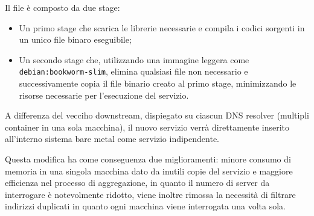 Il file è composto da due stage:
\begin{itemize}
    \item Un primo stage che scarica le librerie necessarie e compila i codici sorgenti in un unico file binaro eseguibile;
    \item Un secondo stage che, utilizzando una immagine leggera come \\ \texttt{debian:bookworm-slim}, elimina qualsiasi file non necessario e successivamente copia il file binario creato al primo stage, minimizzando le risorse necessarie per l'esecuzione del servizio.
\end{itemize}

A differenza del vecciho downstream, dispiegato su ciascun \ac{DNS} resolver (multipli container in una sola macchina), il nuovo servizio verrà direttamente inserito all'interno sistema bare metal come servizio indipendente.

Questa modifica ha come conseguenza due miglioramenti: minore consumo di memoria in una singola macchina dato da inutili copie del servizio e maggiore efficienza nel processo di aggregazione, in quanto il numero di server da interrogare è notevolmente ridotto, viene inoltre rimossa la necessità di filtrare indirizzi duplicati in quanto ogni macchina viene interrogata una volta sola.